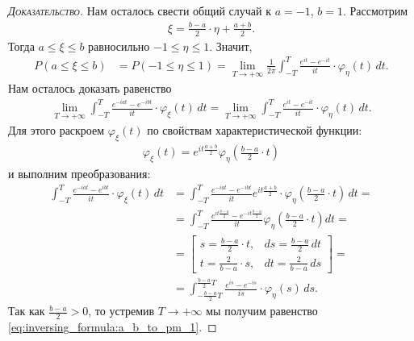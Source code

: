 \documentclass[../main.tex]{subfiles}
\begin{document}
\begin{proof}[\normalfont\textsc{Доказательство}]
 Нам осталось свести общий случай к $ a = -1 $, $ b = 1 $. Рассмотрим \begin{align*}
  \xi = \frac{b-a}{2}\cdot\eta + \frac{a+b}{2}.
 \end{align*} Тогда $ a \leqslant \xi \leqslant b $ равносильно $ -1 \leqslant \eta \leqslant 1 $. Значит,
 \begin{align*}
 P(a \leqslant \xi \leqslant b) &= P(-1 \leqslant \eta \leqslant 1) = \lim_{T \to +\infty} \frac{1}{2\pi} \int_{-T}^{T} \frac{e^{it}-e^{-it}}{it}\cdot\varphi_\eta(t)\,dt. \end{align*} Нам осталось доказать равенство
 \begin{align}
  \label{eq:inversing_formula:a_b_to_pm_1}
  \lim_{T \to +\infty} \int_{-T}^{T} \frac{e^{-iat} - e^{-ibt}}{it} \cdot \varphi_\xi(t)\,dt = \lim_{T \to +\infty} \int_{-T}^{T} \frac{e^{it}-e^{-it}}{it} \cdot \varphi_\eta(t)\,dt.
 \end{align} Для этого раскроем $\varphi_{\xi}(t) $ по свойствам характеристической функции:
 \begin{align*}
  \varphi_\xi(t) = e^{it \frac{a+b}{2}}\varphi_\eta\left(\frac{b-a}{2} \cdot t\right)
 \end{align*}
 и выполним преобразования:	
 \begin{align*}
  \int_{-T}^{T} \frac{e^{-iat} - e^{ibt}}{it} \cdot \varphi_{\xi}(t)\,dt &= \int_{-T}^{T} \frac{e^{-iat}-e^{-ibt}}{it}e^{i t \frac{a+b}{2}} \cdot \varphi_\eta \left( \frac{b-a}{2} \cdot t \right)\,dt = \\
  &= \int_{-T}^{T} \frac{e^{it \frac{b-a}{2}} -e^{-i t \frac{b-a}{2}}}{it} \varphi_\eta \left( \frac{b-a}{2} \cdot t \right)dt = \\
  &= \begin{bmatrix}
   s =  \frac{b-a}{2} \cdot t, & ds = \frac{b-a}{2}\,dt \\
   t = \frac{2}{b-a} \cdot s, & dt = \frac{2}{b-a}\,ds
  \end{bmatrix} = \\
  &= \int_{- \frac{b-a}{2}T}^{\frac{b-a}{2}T} \frac{e^{is}-e^{-is}}{is}\cdot\varphi_\eta(s)\,ds.
 \end{align*} Так как $ \frac{b-a}{2} > 0 $, то устремив $ T \to +\infty $ мы получим равенство \eqref{eq:inversing_formula:a_b_to_pm_1}.
\end{proof}
\end{document}
